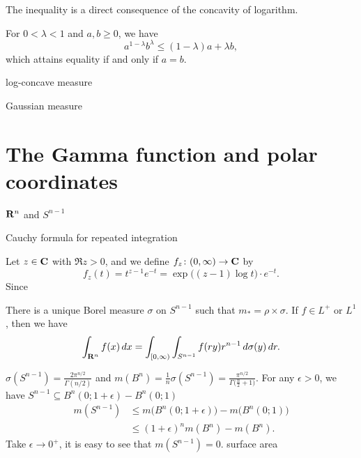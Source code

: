 The inequality is a direct consequence of the concavity of logarithm.
\begin{namedthm} \label{thm:log-conv-ineq}
    For $0 < \lambda <1$ and $a,b \geq 0$, we have 
    \[a^{1-\lambda}b^\lambda \leq  (1-\lambda) a + \lambda b,\] which attains equality if and only if $a =b$.
\end{namedthm}






\begin{namedthm}
    
\end{namedthm}

log-concave measure

Gaussian measure

\section{The Gamma function and polar coordinates} 
$\mathbf{R}^n$ and $S^{n-1}$

Cauchy formula for repeated integration

\label{sec:polar}
Let $z \in \mathbf{C}$ with $\Re z > 0$, and we define $f_z\colon (0,\infty)\to \mathbf{C}$ by \[f_z(t) = t^{z-1} e^{-t} = \exp\bigl((z-1)\log t\bigr)\cdot e^{-t}.\] Since 


\begin{thm}
    There is a unique Borel measure $\sigma$ on $S^{n-1}$ such that $m_* = \rho \times \sigma$. If $f\in L^+$ or $L^1$, then we have \[
        \int_{\mathbf{R}^n} f(x)\,dx = \int_{[0,\infty)}\int_{S^{n-1}} f(ry) r^{n-1}\,d\sigma(y)\,dr.
    \]
\end{thm}


$\sigma(S^{n-1})=\frac{2\pi^{n/2}}{\Gamma(n/2)}$ and $m(B^{n})=\frac{1}{n}\sigma(S^{n-1})=\frac{\pi^{n/2}}{\Gamma\bigl(\frac{n}{2}+1\bigr)}$.
For any $\epsilon>0$, we have $S^{n-1}\subseteq B^{n}(0;1+\epsilon)-B^{n}(0;1)$
\begin{align*}
m(S^{n-1}) & \leq m\bigl(B^{n}(0;1+\epsilon)\bigr)-m\bigl(B^{n}(0;1)\bigr)\\
 & \leq(1+\epsilon)^{n}m(B^{n})-m(B^{n}).
\end{align*}
Take $\epsilon\to0^{+}$, it is easy to see that $m(S^{n-1})=0$.
surface area